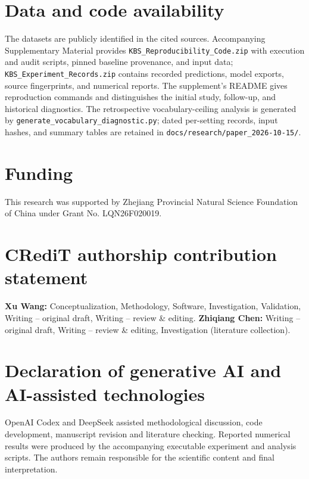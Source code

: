 \documentclass[a4paper,fleqn,review]{cas-sc}
\begin{document}
\section*{Data and code availability}
The datasets are publicly identified in the cited sources. Accompanying Supplementary Material provides \texttt{KBS\_Reproducibility\_Code.zip} with execution and audit scripts, pinned baseline provenance, and input data; \texttt{KBS\_Experiment\_Records.zip} contains recorded predictions, model exports, source fingerprints, and numerical reports. The supplement's README gives reproduction commands and distinguishes the initial study, follow-up, and historical diagnostics. The retrospective vocabulary-ceiling analysis is generated by \texttt{generate\_vocabulary\_diagnostic.py}; dated per-setting records, input hashes, and summary tables are retained in \texttt{docs/research/paper\_2026-10-15/}.

\section*{Funding}
This research was supported by Zhejiang Provincial Natural Science Foundation
of China under Grant No. LQN26F020019.

\section*{CRediT authorship contribution statement}
\textbf{Xu Wang:} Conceptualization, Methodology, Software, Investigation,
Validation, Writing -- original draft, Writing -- review \& editing.
\textbf{Zhiqiang Chen:} Writing -- original draft, Writing -- review \& editing,
Investigation (literature collection).

\section*{Declaration of generative AI and AI-assisted technologies}
OpenAI Codex and DeepSeek assisted methodological discussion, code development, manuscript revision and literature checking. Reported numerical results were produced by the accompanying executable experiment and analysis scripts. The authors remain responsible for the scientific content and final interpretation.



\end{document}
